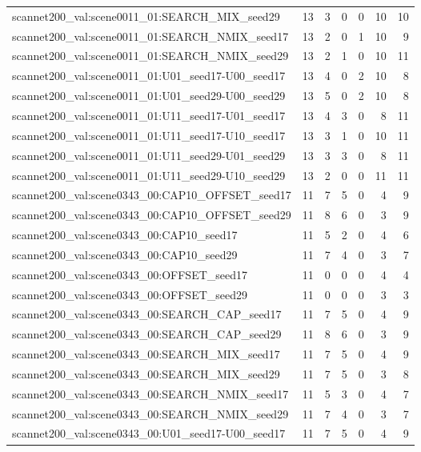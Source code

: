\begin{table}[t]
\begin{tabular}{lrrrrrr}
scannet200\_val:scene0011\_01:SEARCH\_MIX\_seed29 & 13 & 3 & 0 & 0 & 10 & 10 \\
scannet200\_val:scene0011\_01:SEARCH\_NMIX\_seed17 & 13 & 2 & 0 & 1 & 10 & 9 \\
scannet200\_val:scene0011\_01:SEARCH\_NMIX\_seed29 & 13 & 2 & 1 & 0 & 10 & 11 \\
scannet200\_val:scene0011\_01:U01\_seed17-U00\_seed17 & 13 & 4 & 0 & 2 & 10 & 8 \\
scannet200\_val:scene0011\_01:U01\_seed29-U00\_seed29 & 13 & 5 & 0 & 2 & 10 & 8 \\
scannet200\_val:scene0011\_01:U11\_seed17-U01\_seed17 & 13 & 4 & 3 & 0 & 8 & 11 \\
scannet200\_val:scene0011\_01:U11\_seed17-U10\_seed17 & 13 & 3 & 1 & 0 & 10 & 11 \\
scannet200\_val:scene0011\_01:U11\_seed29-U01\_seed29 & 13 & 3 & 3 & 0 & 8 & 11 \\
scannet200\_val:scene0011\_01:U11\_seed29-U10\_seed29 & 13 & 2 & 0 & 0 & 11 & 11 \\
scannet200\_val:scene0343\_00:CAP10\_OFFSET\_seed17 & 11 & 7 & 5 & 0 & 4 & 9 \\
scannet200\_val:scene0343\_00:CAP10\_OFFSET\_seed29 & 11 & 8 & 6 & 0 & 3 & 9 \\
scannet200\_val:scene0343\_00:CAP10\_seed17 & 11 & 5 & 2 & 0 & 4 & 6 \\
scannet200\_val:scene0343\_00:CAP10\_seed29 & 11 & 7 & 4 & 0 & 3 & 7 \\
scannet200\_val:scene0343\_00:OFFSET\_seed17 & 11 & 0 & 0 & 0 & 4 & 4 \\
scannet200\_val:scene0343\_00:OFFSET\_seed29 & 11 & 0 & 0 & 0 & 3 & 3 \\
scannet200\_val:scene0343\_00:SEARCH\_CAP\_seed17 & 11 & 7 & 5 & 0 & 4 & 9 \\
scannet200\_val:scene0343\_00:SEARCH\_CAP\_seed29 & 11 & 8 & 6 & 0 & 3 & 9 \\
scannet200\_val:scene0343\_00:SEARCH\_MIX\_seed17 & 11 & 7 & 5 & 0 & 4 & 9 \\
scannet200\_val:scene0343\_00:SEARCH\_MIX\_seed29 & 11 & 7 & 5 & 0 & 3 & 8 \\
scannet200\_val:scene0343\_00:SEARCH\_NMIX\_seed17 & 11 & 5 & 3 & 0 & 4 & 7 \\
scannet200\_val:scene0343\_00:SEARCH\_NMIX\_seed29 & 11 & 7 & 4 & 0 & 3 & 7 \\
scannet200\_val:scene0343\_00:U01\_seed17-U00\_seed17 & 11 & 7 & 5 & 0 & 4 & 9 \\

\end{tabular}
\end{table}
